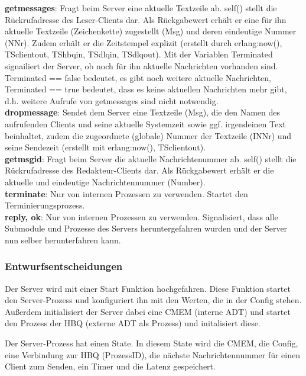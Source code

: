 \documentclass{article}
\begin{document}
\textbf{getmessages}: Fragt beim Server eine aktuelle Textzeile ab. self() stellt die Rückrufadresse des Leser-Clients dar. Als Rückgabewert erhält er eine für ihn aktuelle Textzeile (Zeichenkette) zugestellt (Msg) und deren eindeutige Nummer (NNr).
Zudem erhält er die Zeitstempel explizit (erstellt durch erlang:now(), TSclientout, TShbqin, TSdlqin, TSdlqout).
Mit der Variablen Terminated signailiert der Server, ob noch für ihn aktuelle Nachrichten vorhanden sind. Terminated == false bedeutet, es gibt noch weitere aktuelle Nachrichten, Terminated == true bedeutet, dass es keine aktuellen Nachrichten mehr gibt, d.h. weitere Aufrufe von getmessages sind nicht notwendig.\\

\textbf{dropmessage}: Sendet dem Server eine Textzeile (Msg), die den  Namen des aufrufenden Clients und seine aktuelle Systemzeit sowie ggf. irgendeinen Text beinhaltet, zudem die zugeordnete (globale) Nummer der Textzeile (INNr) und seine Sendezeit (erstellt mit erlang:now(), TSclientout).\\

\textbf{getmsgid}: Fragt beim Server die aktuelle Nachrichtenummer ab. self() stellt die Rückrufadresse des Redakteur-Clients dar. Als Rückgabewert erhält er die aktuelle und eindeutige Nachrichtennummer (Number).\\

\textbf{terminate}: Nur von internen Prozessen zu verwenden. Startet den Terminierungsprozess.\\

\textbf{{reply, ok}}: Nur von internen Prozessen zu verwenden. Signalisiert, dass alle Submodule und Prozesse des Servers
heruntergefahren wurden und der Server nun selber herunterfahren kann.\\

\subsubsection{Entwurfsentscheidungen}
Der Server wird mit einer Start Funktion hochgefahren. Diese Funktion startet den Server-Prozess und konfiguriert ihn
mit den Werten, die in der Config stehen. Außerdem initialisiert der Server dabei eine CMEM (interne ADT) und startet
den Prozess der HBQ (externe ADT als Prozess) und initalisiert diese.

Der Server-Prozess hat einen State. In diesem State wird die CMEM, die Config, eine Verbindung zur HBQ (ProzessID),
die nächste Nachrichtennummer für einen Client zum Senden, ein Timer und die Latenz gespeichert.
\end{document}
